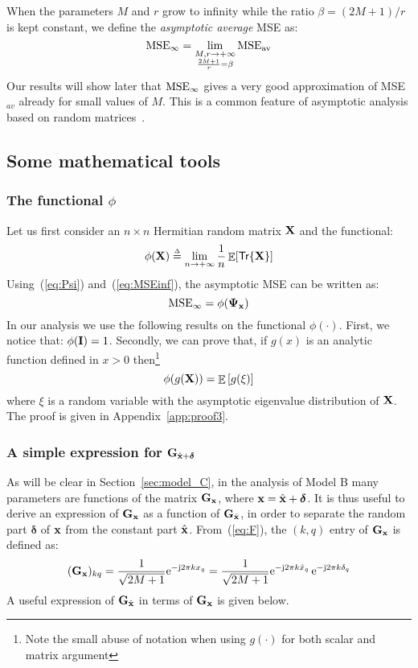 \documentclass[final, a4paper]{IEEEtran}
\newcommand{\ee}{{\rm e}}
\newcommand{\jj}{{\rm j}}  \newcommand{\ii}{{\rm i}}  \newcommand{\dd}{{\rm\,d}}
\newcommand{\xv}{{\bf x}}
\newcommand{\Gm}{{\bf G}}
\newcommand{\Id}{{\bf I}}
\newcommand{\Xm}{{\bf X}}
\def\xvh{{\hat{\xv}}}
\newcommand{\deltav}{\boldsymbol{\delta}}
\newcommand{\Psim}{\hbox{\boldmath$\Psi$}}
\def\trace{\mathsf{Tr}}
\newcommand{\eqdef}{\ensuremath{\stackrel{\mbox{\upshape\tiny $\Delta$}}{=}}}
\def\MSEav{{\rm MSE}_{\rm av}}
\def\MSEinf{{\rm MSE}_{\infty}}
\begin{document}
When the parameters
$M$ and $r$ grow to infinity while the ratio $\beta=(2M+1)/r$ is kept constant, we
define the {\em asymptotic average} MSE as:
\begin{equation}
\MSEinf = \lim_{\substack{M,r\rightarrow
+\infty \\\frac{2M+1}{r}=\beta}} \MSEav
\label{eq:MSEinf}
\end{equation}
Our results will show later that $\MSEinf$ gives a very good approximation of MSE$_{av}$ already for small
values of $M$. This is a common feature of asymptotic analysis based on random matrices~\cite{TulinoVerdu}.

\subsection{Some mathematical tools}

\subsubsection{The functional $\phi$}
\label{sec:free|probability}

Let us first consider an $n\times n$ Hermitian random matrix $\Xm$ and the functional:
\[ \phi(\Xm) \eqdef \lim_{n\rightarrow +\infty} \frac{1}{n}\EE[\trace\{\Xm\}] \]
Using~(\ref{eq:Psi}) and~(\ref{eq:MSEinf}), the asymptotic MSE can be written as:
\begin{equation}
{\MSEinf} = \phi(\Psim_\xv)
\label{eq:MSEinf-Psi}
\end{equation}
In our analysis we use  the following results on the functional
$\phi(\cdot)$. First, we notice that: $\phi(\Id)=1$. Secondly, we
can prove that, if $g(x)$ is an analytic function defined in $x
>0$ then\footnote{
Note the small abuse of notation
when using $g(\cdot)$ for both scalar and matrix argument
}
\begin{equation}
\phi(g(\Xm)) = \EE\left[g(\xi)\right]
\label{eq:g(X)}
\end{equation}
where $\xi$ is a random variable with the asymptotic eigenvalue distribution of $\Xm$.
The proof is given in Appendix~\ref{app:proof3}.


\subsubsection{A simple expression for $\Gm_{\xvh+\boldsymbol{\delta}}$}
As will be clear in Section~\ref{sec:model_C},
in the analysis of Model B many parameters are functions of
the matrix $\Gm_\xv$, where $\xv=\xvh+\deltav$.
It is thus useful to derive an expression of $\Gm_\xv$ as a
function of $\Gm_\xvh$, in order to separate the random part $\deltav$ of $\xv$
from the constant part $\xvh$. From~(\ref{eq:F}), the $(k,q)$ entry of $\Gm_{\xv}$
is defined as:
\[ (\Gm_{\xv})_{kq} = \frac{1}{\sqrt{2M+1}}\ee^{-\jj 2\pi k x_q} =
     \frac{1}{\sqrt{2M+1}}\ee^{-\jj 2\pi k \hat{x}_q} \,\ee^{-\jj 2\pi k \delta_q} \]
A useful expression of $\Gm_{\xvh}$ in terms of $\Gm_\xv$ is given below.
\end{document}
